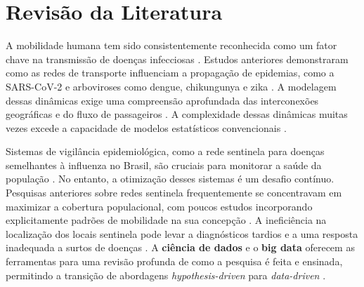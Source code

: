 \documentclass[preprint,12pt]{elsarticle}
\begin{document}
\section{Revisão da Literatura}

A mobilidade humana tem sido consistentemente reconhecida como um fator chave na transmissão de doenças infecciosas \cite{oliveira2024summary, inovacao2024modelagem, lima2022climate, lima2022dynamics, tang2021fields}. Estudos anteriores demonstraram como as redes de transporte influenciam a propagação de epidemias, como a SARS-CoV-2 \cite{oliveira2024summary, inovacao2024modelagem, silva2022machine} e arboviroses como dengue, chikungunya e zika \cite{inovacao2024modelagem, lima2022temporal, lima2022climate}. A modelagem dessas dinâmicas exige uma compreensão aprofundada das interconexões geográficas e do fluxo de passageiros \cite{inovacao2024modelagem}. A complexidade dessas dinâmicas muitas vezes excede a capacidade de modelos estatísticos convencionais \cite{saldanha2021sistemas}.

Sistemas de vigilância epidemiológica, como a rede sentinela para doenças semelhantes à influenza no Brasil, são cruciais para monitorar a saúde da população \cite{oliveira2024findings, oliveira2024ranking}. No entanto, a otimização desses sistemas é um desafio contínuo. Pesquisas anteriores sobre redes sentinela frequentemente se concentravam em maximizar a cobertura populacional, com poucos estudos incorporando explicitamente padrões de mobilidade na sua concepção \cite{oliveira2024genetic, oliveira2024improvements}. A ineficiência na localização dos locais sentinela pode levar a diagnósticos tardios e a uma resposta inadequada a surtos de doenças \cite{oliveira2024improvements}. A \textbf{ciência de dados} e o \textbf{big data} oferecem as ferramentas para uma revisão profunda de como a pesquisa é feita e ensinada, permitindo a transição de abordagens \textit{hypothesis-driven} para \textit{data-driven} \cite{saldanha2021introducao, saldanha2021inovacao, tang2021fields}.
\end{document}
